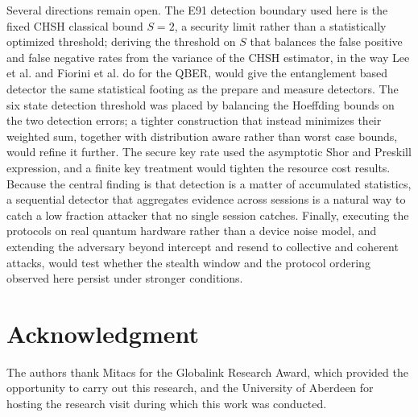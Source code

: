 \documentclass[conference]{IEEEtran}
\begin{document}
Several directions remain open. The E91 detection boundary used here is the fixed
CHSH classical bound $S = 2$, a security limit rather than a statistically
optimized threshold; deriving the threshold on $S$ that balances the false
positive and false negative rates from the variance of the CHSH estimator, in the
way Lee et al. \cite{lee2022eavesdropping} and Fiorini et al.
\cite{fiorini2025sixstate} do for the QBER, would give the entanglement based
detector the same statistical footing as the prepare and measure detectors. The
six state detection threshold was placed by balancing the Hoeffding bounds on the
two detection errors; a tighter construction that instead minimizes their weighted
sum, together with distribution aware rather than worst case bounds, would refine
it further. The secure key rate used the asymptotic Shor and Preskill expression,
and a finite key treatment would tighten the resource cost results. Because the
central finding is that detection is a matter of accumulated statistics, a
sequential detector that aggregates evidence across sessions is a natural way to
catch a low fraction attacker that no single session catches. Finally, executing
the protocols on real quantum hardware rather than a device noise model, and
extending the adversary beyond intercept and resend to collective and coherent
attacks, would test whether the stealth window and the protocol ordering observed
here persist under stronger conditions.

\section*{Acknowledgment}
The authors thank Mitacs for the Globalink Research Award, which provided the
opportunity to carry out this research, and the University of Aberdeen for
hosting the research visit during which this work was conducted.



\end{document}

